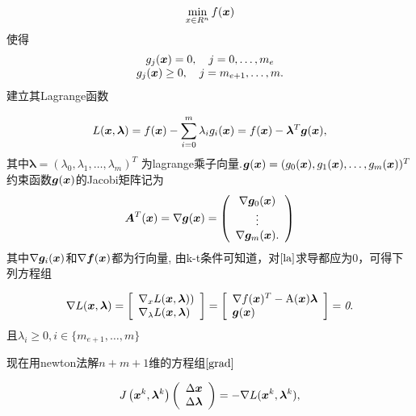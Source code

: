 \documentclass[12pt,oneside,a4paper]{article}
\begin{document}
\begin{equation*}
\min _{x \in R^{n}} f({\boldsymbol x})
\end{equation*}
使得
\begin{equation*}
\begin{array}{c}
g_{j}({\boldsymbol x})=0, \quad j=0, \ldots, m_{e} \\
g_{j}({\boldsymbol x}) \geq 0, \quad j=m_{e+1}, \ldots, m .
\end{array}
\end{equation*}
建立其Lagrange函数

\begin{equation}\label{la}
L({\boldsymbol x}, \boldsymbol{ \lambda})=f({\boldsymbol x})-\sum_{i=0}^{m} \lambda_{i}  g_{i}({\boldsymbol x})
=f({\boldsymbol x})-\boldsymbol{\lambda}^T  {\boldsymbol g}({\boldsymbol x}),
\end{equation}
其中$\boldsymbol{\lambda} = (\lambda_0,\lambda_1,\ldots,\lambda_{m})^T$
为lagrange乘子向量.${\boldsymbol g}({\boldsymbol x}) = (g_0({\boldsymbol x}),g_1({\boldsymbol x}),\ldots,g_{m}({\boldsymbol x}))^T$
约束函数${\boldsymbol g}({\boldsymbol x})$的Jacobi矩阵记为
\begin{equation*}
{\boldsymbol A}^T({\boldsymbol x})=\nabla {\boldsymbol g}({\boldsymbol x})=\left(\begin{array}{c}
\nabla {\boldsymbol g}_{0}({\boldsymbol x}) \\
\vdots \\
\nabla {\boldsymbol g}_{m}({\boldsymbol x}).
\end{array}\right)
\end{equation*}
其中$\nabla {\boldsymbol g}_{i}({\boldsymbol x})$和$\nabla {\boldsymbol f}({\boldsymbol x})$都为行向量,
由k-t条件可知道，对$\ref{la}$求导都应为0，可得下列方程组

\begin{equation}\label{grad}
\nabla L({\boldsymbol x}, \boldsymbol{ \lambda})=\left[\begin{array}{l}
\nabla_{x} L({\boldsymbol x}, \boldsymbol{ \lambda})) \\
\nabla_{\lambda} L({\boldsymbol x}, \boldsymbol{ \lambda})
\end{array}\right]=\left[\begin{array}{l}
\nabla f({\boldsymbol x})^T-\mathrm{A}({\boldsymbol x})\boldsymbol{\lambda} \\
{\boldsymbol g}({\boldsymbol x})
\end{array}\right]= \emph{0}.
\end{equation}
且$\lambda_i \geq 0,i \in \{m_{e+1},\ldots,m\}$

现在用newton法解$n+m+1$维的方程组$\ref{grad}$

\begin{equation}\label{new1}
J\left({\boldsymbol x}^{k}, \boldsymbol{\lambda}^{k}\right)\left(\begin{array}{c}
\Delta {\boldsymbol x} \\
\Delta  \boldsymbol{ \lambda}
\end{array}\right)=-\nabla L({\boldsymbol x}^k, \boldsymbol{ \lambda}^k),
\end{equation}
\end{document}
